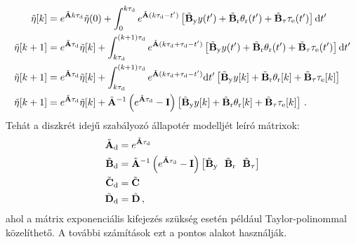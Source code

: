\begin{align}
    \begin{split}
        \tilde{\mathbf{\eta}}[k] &= e^{\tilde {\mathbf{A}} k\tau_{\mathrm{d}}}\tilde{\mathbf{\eta}}(0) + \int_{0}^{k\tau_{\mathrm{d}}} e^{\tilde {\mathbf{A}} (k\tau_{\mathrm{d}}-t')}\left[\tilde{\mathbf{B}}_{\mathrm{y}} y(t') + 
        \tilde{\mathbf{B}}_{\mathrm{r}} \theta_{\mathrm{r}}(t') +
        \tilde{\mathbf{B}}_{\mathrm{\tau}} \tau_{\mathrm{e}}(t')\right]\mathrm{d}t' \\
        \tilde{\mathbf{\eta}}[k+1] &= e^{\tilde {\mathbf{A}}\tau_{\mathrm{d}}}\tilde{\mathbf{\eta}}[k] + \int_{k\tau_{\mathrm{d}}}^{(k+1)\tau_{\mathrm{d}}} e^{\tilde {\mathbf{A}} (k\tau_{\mathrm{d}} + \tau_{\mathrm{d}}-t')}\left[\tilde{\mathbf{B}}_{\mathrm{y}} y(t') + 
        \tilde{\mathbf{B}}_{\mathrm{r}} \theta_{\mathrm{r}}(t') +
        \tilde{\mathbf{B}}_{\mathrm{\tau}} \tau_{\mathrm{e}}(t')\right] \mathrm{d}t' \\
        \tilde{\mathbf{\eta}}[k+1] &= e^{\tilde {\mathbf{A}}\tau_{\mathrm{d}}}\tilde{\mathbf{\eta}}[k] + \int_{k\tau_{\mathrm{d}}}^{(k+1)\tau_{\mathrm{d}}} e^{\tilde {\mathbf{A}} (k\tau_{\mathrm{d}} + \tau_{\mathrm{d}}-t')}\mathrm{d}t'\left[\tilde{\mathbf{B}}_{\mathrm{y}} y[k] + 
        \tilde{\mathbf{B}}_{\mathrm{r}} \theta_{\mathrm{r}}[k] +
        \tilde{\mathbf{B}}_{\mathrm{\tau}} \tau_{\mathrm{e}}[k]\right] \\
        \tilde{\mathbf{\eta}}[k+1] &= e^{\tilde {\mathbf{A}}\tau_{\mathrm{d}}}\tilde{\mathbf{\eta}}[k] + \tilde{\mathbf{A}}^{-1}\left(e^{\tilde {\mathbf{A}}\tau_{\mathrm{d}}}-\mathbf{I}\right)\left[\tilde{\mathbf{B}}_{\mathrm{y}} y[k] + 
        \tilde{\mathbf{B}}_{\mathrm{r}} \theta_{\mathrm{r}}[k] +
        \tilde{\mathbf{B}}_{\mathrm{\tau}} \tau_{\mathrm{e}}[k]\right]\,.
    \end{split}        
\end{align}
Tehát a diszkrét idejű szabályozó állapotér modelljét leíró mátrixok:
\begin{align}\label{eq:discrete_controller_matrices}
    \begin{split}
        \tilde{\mathbf{A}}_{\mathrm{d}} &= e^{\tilde {\mathbf{A}}\tau_{\mathrm{d}}} \\
        \tilde{\mathbf{B}}_{\mathrm{d}} &= \tilde{\mathbf{A}}^{-1}\left(e^{\tilde {\mathbf{A}}\tau_{\mathrm{d}}}-\mathbf{I}\right)\left[\tilde{\mathbf{B}}_{\mathrm{y}}~~\tilde{\mathbf{B}}_{\mathrm{r}}~~\tilde{\mathbf{B}}_{\mathrm{\tau}}\right] \\
        \tilde{\mathbf{C}}_{\mathrm{d}} &= \tilde{\mathbf{C}} \\
        \tilde{\mathbf{D}}_{\mathrm{d}} &= \tilde{\mathbf{D}} \,,
    \end{split}        
\end{align}
ahol a mátrix exponenciális kifejezés szükség esetén például Taylor-polinommal közelíthető. A további számítások ezt 
a pontos alakot használják.

